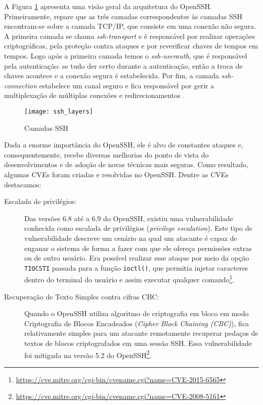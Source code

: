 A Figura \ref{fig:openssh_layer} apresenta uma visão geral da arquitetura do
OpenSSH. Primeiramente, repare que as três camadas correspondentes às camadas
SSH encontram-se sobre a camada TCP/IP, que consiste em uma conexão não segura.
A primeira camada se chama \emph{ssh-transport} e é responsável por
realizar operações criptográficas, pela proteção contra ataques e por reverificar chaves
de tempos em tempos. Logo após a primeira camada temos o \emph{ssh-userauth},
que é responsável pela autenticação: se tudo der certo durante a autenticação,
então a troca de chaves acontece e a conexão segura é estabelecida. Por fim, a
camada \emph{ssh-connection} estabelece um canal seguro e fica responsável
por gerir a multiplexação de múltiplas conexões e redirecionamentos
\citep{proopenssh, opensshhood}.

\begin{figure}[!h]
  \centering
  \texttt{[image: ssh\_layers]}
  \caption[Camadas SSH]{Camadas SSH \citep{opensshhood}}
  \label{fig:openssh_layer}
\end{figure}

Dada a enorme importância do OpenSSH, ele é alvo de constantes ataques e,
consequentemente, recebe diversas melhorias do ponto de vista do
desenvolvimentos e de adoção de novas técnicas mais seguras. Como resultado, algumas CVEs
foram criadas e resolvidas no OpenSSH. Dentre as CVEs destacamos:

\begin{description}
  \item [Escalada de privilégios:] Das versões 6.8 até a 6.9 do OpenSSH,
existiu uma vulnerabilidade conhecida como escalada de privilégios
(\emph{privilege escalation}). Este tipo de vulnerabilidade descreve um cenário
na qual um atacante é capaz de enganar o sistema de forma a fazer com que ele
ofereça permissões extras ou de outro usuário. Era possível realizar esse
ataque por meio da opção \texttt{TIOCSTI} passada para a função
\texttt{ioctl()}, que permitia injetar caracteres dentro do terminal do usuário
e assim executar qualquer
comando\footnote{\url{https://cve.mitre.org/cgi-bin/cvename.cgi?name=CVE-2015-6565}}.

  \item [Recuperação de Texto Simples contra cifras CBC:] Quando o OpenSSH utiliza algoritmo de criptografia em bloco em modo
Criptografia de Blocos Encadeados (\emph{Cipher Block Chaining (CBC)}), fica
relativamente simples para um atacante remotamente recuperar pedaços de textos
de blocos criptografados em uma sessão SSH. Essa vulnerabilidade foi mitigada
na versão 5.2 do
OpenSSH\footnote{\url{https://cve.mitre.org/cgi-bin/cvename.cgi?name=CVE-2008-5161}}.

\end{description}

